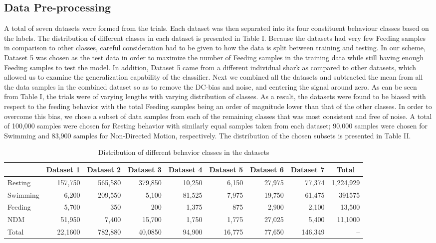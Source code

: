 \documentclass[conference]{IEEEtran}
\begin{document}
\subsection{Data Pre-processing}
A total of seven datasets were formed from the trials. Each dataset was then separated into its four constituent behaviour classes based on the labels. The distribution of different classes in each dataset is presented in Table I. Because the datasets had very few Feeding samples in comparison to other classes, careful consideration had to be given to how the data is split between training and testing. In our scheme, Dataset 5 was chosen as the test data in order to maximize the number of Feeding samples in the training data while still having enough Feeding samples to test the model.  In addition, Dataset 5 came from a different individual shark as compared to other datasets, which allowed us to examine the generalization capability of the classifier.
Next we combined all the datasets and subtracted the mean from all the data samples in the combined dataset so as to remove the DC-bias and noise, and centering the signal around zero. 
As can be seen from Table I, the trials were of varying lengths with varying distribution of classes. As a result, the datasets were found to be biased with respect to the feeding behavior with the total Feeding samples being an order of magnitude lower than that of the other classes. In order to overcome this bias, we chose a subset of data samples from each of the remaining classes that was most consistent and free of noise. A total of 100,000 samples were chosen for Resting behavior with similarly equal samples taken from each dataset; 90,000 samples were chosen for Swimming and 83,900 samples for Non-Directed Motion, respectively. The distribution of the chosen subsets is presented in Table II.
\begin{table}[tp!]
	\centering
	\caption{Distribution of different behavior classes in the datasets}
	\begin{tabular}{l r r r r r r r r}
	\hline
	& \textbf{Dataset 1} & \textbf{Dataset 2} & \textbf{Dataset 3} & \textbf{Dataset 4} & \textbf{Dataset 5} & \textbf{Dataset 6} & \textbf{Dataset 7} & \multicolumn{1}{c}{\textbf{Total}}\\
	\hline
	Resting & 157,750 & 565,580 & 379,850 & 10,250 & 6,150 & 27,975 & 77,374 & 1,224,929 \\
	Swimming & 6,200 & 209,550 & 5,100 & 81,525 & 7,975 & 19,750 & 61,475 & 391575 \\
	Feeding & 5,700 & 350 & 200 & 1,375 & 875 & 2,900 & 2,100 & 13,500 \\
	NDM & 51,950 & 7,400 & 15,700 & 1,750 & 1,775 & 27,025 & 5,400 & 11,1000 \\
	Total & 22,1600 & 782,880 & 40,0850 & 94,900 & 16,775 & 77,650 & 146,349 & -- \\
	\hline
	\end{tabular}
	\label{}
\end{table}
\end{document}
